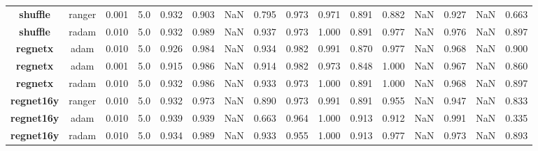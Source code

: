\begin{table}
\begin{tabular}{c|c|c|c|c|c|c|c|c|c|c|c|c|}
\textbf{shuffle  } &  ranger &  0.001 &         5.0 &         0.932 &            0.903 &               NaN &                0.795 &           0.973 &              0.971 &           0.891 &              0.882 &             NaN &              0.927 &             NaN &              0.663 \\
\textbf{shuffle  } &   radam &  0.010 &         5.0 &         0.932 &            0.989 &               NaN &                0.937 &           0.973 &              1.000 &           0.891 &              0.977 &             NaN &              0.976 &             NaN &              0.897 \\
\textbf{regnetx  } &    adam &  0.010 &         5.0 &         0.926 &            0.984 &               NaN &                0.934 &           0.982 &              0.991 &           0.870 &              0.977 &             NaN &              0.968 &             NaN &              0.900 \\
\textbf{regnetx  } &    adam &  0.001 &         5.0 &         0.915 &            0.986 &               NaN &                0.914 &           0.982 &              0.973 &           0.848 &              1.000 &             NaN &              0.967 &             NaN &              0.860 \\
\textbf{regnetx  } &   radam &  0.010 &         5.0 &         0.932 &            0.986 &               NaN &                0.933 &           0.973 &              1.000 &           0.891 &              1.000 &             NaN &              0.968 &             NaN &              0.897 \\
\textbf{regnet16y} &  ranger &  0.010 &         5.0 &         0.932 &            0.973 &               NaN &                0.890 &           0.973 &              0.991 &           0.891 &              0.955 &             NaN &              0.947 &             NaN &              0.833 \\
\textbf{regnet16y} &    adam &  0.010 &         5.0 &         0.939 &            0.939 &               NaN &                0.663 &           0.964 &              1.000 &           0.913 &              0.912 &             NaN &              0.991 &             NaN &              0.335 \\
\textbf{regnet16y} &   radam &  0.010 &         5.0 &         0.934 &            0.989 &               NaN &                0.933 &           0.955 &              1.000 &           0.913 &              0.977 &             NaN &              0.973 &             NaN &              0.893 \\

\end{tabular}
\end{table}
